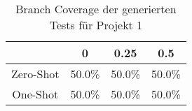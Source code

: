 \bgroup
\def\arraystretch{2}
\begin{table}[H]
	\vspace{.5cm}
	\centering		
	\begin{center}
		\begin{tabular}{|c||c|c|c|}
			\hline 
			& 0 & 0.25 & 0.5 \\
			\hline 
			\hline
			Zero-Shot & 50.0\% & 50.0\% & 50.0\% \\
			\hline
			One-Shot & 50.0\% & 50.0\% & 50.0\% \\
			\hline
		\end{tabular} 
	\end{center}
	\caption{Branch Coverage der generierten Tests für Projekt 1}
	\label{fig:branch-1}
	\vspace{-.8cm}
\end{table}
\egroup